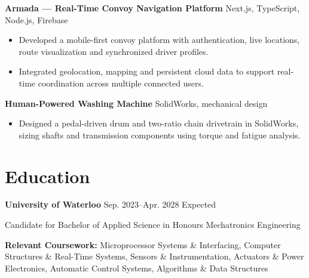 \documentclass[letterpaper,10pt]{article}
\begin{document}
\vspace{1pt}

\textbf{Armada --- Real-Time Convoy Navigation Platform}
\hfill
{\small Next.js, TypeScript, Node.js, Firebase}

\begin{itemize}
    \item Developed a mobile-first convoy platform with authentication, live locations, route visualization and synchronized driver profiles.
    \item Integrated geolocation, mapping and persistent cloud data to support real-time coordination across multiple connected users.
\end{itemize}

\vspace{1pt}

\textbf{Human-Powered Washing Machine}
\hfill
{\small SolidWorks, mechanical design}

\begin{itemize}
    \item Designed a pedal-driven drum and two-ratio chain drivetrain in SolidWorks, sizing shafts and transmission components using torque and fatigue analysis.
\end{itemize}

\section{Education}

\textbf{University of Waterloo}
\hfill
Sep. 2023--Apr. 2028 Expected

Candidate for Bachelor of Applied Science in Honours Mechatronics Engineering

{\small
\textbf{Relevant Coursework:}
Microprocessor Systems \& Interfacing, Computer Structures \& Real-Time Systems,
Sensors \& Instrumentation, Actuators \& Power Electronics,
Automatic Control Systems, Algorithms \& Data Structures}
\end{document}
